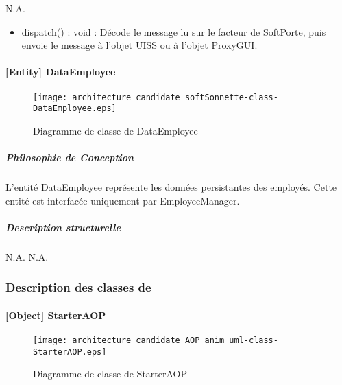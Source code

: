             N.A.
            \begin{itemize}
                \item {dispatch() : void : Décode le message lu sur le facteur de SoftPorte, puis envoie le message à l'objet UISS ou à l'objet ProxyGUI.}
            \end{itemize} 
            \newpage

    \paragraph{[Entity] DataEmployee}

        \begin{figure} [H]
            \centering
            \texttt{[image: architecture\_candidate\_softSonnette-class-DataEmployee.eps]}
            \caption{Diagramme de classe de DataEmployee}
            \label{Classe-DataEmployee}
        \end{figure}
    
            \subparagraph{Philosophie de Conception}%
                
            L'entité DataEmployee représente les données persistantes des employés.
            Cette entité est interfacée uniquement par EmployeeManager.              
            \subparagraph{Description structurelle}%
                
            N.A.
            N.A.
            \newpage

    \subsubsection{Description des classes de \appliA}%

    \paragraph{[Object] StarterAOP}

        \begin{figure} [H]
            \centering
            \texttt{[image: architecture\_candidate\_AOP\_anim\_uml-class-StarterAOP.eps]}
            \caption{Diagramme de classe de StarterAOP}
            \label{Classe-StarterAOP}
        \end{figure}

